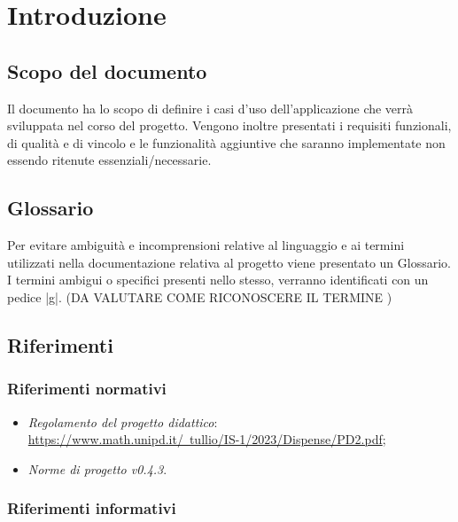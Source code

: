 \documentclass[10pt, a4paper]{article}
\title{\titolo}
\author{SWEetCode}
\begin{document}



\newpage

\tableofcontents
\newpage

\section{Introduzione}
\subsection{Scopo del documento}
Il documento ha lo scopo di definire i casi d'uso dell'applicazione che verrà sviluppata nel corso del progetto. Vengono inoltre presentati i requisiti funzionali, di qualità e di vincolo e le funzionalità aggiuntive che saranno implementate non essendo ritenute essenziali/necessarie.
\\
\subsection{Glossario}
Per evitare ambiguità e incomprensioni relative al linguaggio e ai termini utilizzati nella documentazione relativa al progetto viene presentato un Glossario. I termini ambigui o specifici presenti nello stesso, verranno identificati con un pedice |g|. (DA VALUTARE COME RICONOSCERE IL TERMINE )
\\
\subsection{Riferimenti}
   \subsubsection{Riferimenti normativi}
   \begin{itemize}
    \item \textit{Regolamento del progetto didattico}: \\
    \href{https://www.math.unipd.it/~tullio/IS-1/2023/Dispense/PD2.pdf}{https://www.math.unipd.it/~tullio/IS-1/2023/Dispense/PD2.pdf};
    \item \textit{Norme di progetto v0.4.3}.
    \end{itemize}
    
    \subsubsection{Riferimenti informativi}
    
\end{document}
